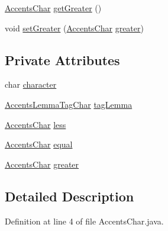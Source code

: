\begin{DoxyCompactItemize}
\item 
\hyperlink{classbr_1_1usp_1_1cata_1_1util_1_1lemmatizer_1_1_accents_char}{Accents\+Char} \hyperlink{classbr_1_1usp_1_1cata_1_1util_1_1lemmatizer_1_1_accents_char_a192c696ecbf7ed1cccb6bb233048b935}{get\+Greater} ()
\item 
void \hyperlink{classbr_1_1usp_1_1cata_1_1util_1_1lemmatizer_1_1_accents_char_ad60c7c8cd8ba6de43e9e06c6f2306e40}{set\+Greater} (\hyperlink{classbr_1_1usp_1_1cata_1_1util_1_1lemmatizer_1_1_accents_char}{Accents\+Char} \hyperlink{classbr_1_1usp_1_1cata_1_1util_1_1lemmatizer_1_1_accents_char_a3680eda0e3124a1c26639cde19bc3f3f}{greater})
\end{DoxyCompactItemize}
\subsection*{Private Attributes}
\begin{DoxyCompactItemize}
\item 
char \hyperlink{classbr_1_1usp_1_1cata_1_1util_1_1lemmatizer_1_1_accents_char_adead262403ce29190286fbc5c04ec1f6}{character}
\item 
\hyperlink{classbr_1_1usp_1_1cata_1_1util_1_1lemmatizer_1_1_accents_lemma_tag_char}{Accents\+Lemma\+Tag\+Char} \hyperlink{classbr_1_1usp_1_1cata_1_1util_1_1lemmatizer_1_1_accents_char_a0cb3f3f9b47f36a8786117764e48281f}{tag\+Lemma}
\item 
\hyperlink{classbr_1_1usp_1_1cata_1_1util_1_1lemmatizer_1_1_accents_char}{Accents\+Char} \hyperlink{classbr_1_1usp_1_1cata_1_1util_1_1lemmatizer_1_1_accents_char_ad84239a5da911adc9af48baa464a54db}{less}
\item 
\hyperlink{classbr_1_1usp_1_1cata_1_1util_1_1lemmatizer_1_1_accents_char}{Accents\+Char} \hyperlink{classbr_1_1usp_1_1cata_1_1util_1_1lemmatizer_1_1_accents_char_afe7a303e8950e63eeee270149768944c}{equal}
\item 
\hyperlink{classbr_1_1usp_1_1cata_1_1util_1_1lemmatizer_1_1_accents_char}{Accents\+Char} \hyperlink{classbr_1_1usp_1_1cata_1_1util_1_1lemmatizer_1_1_accents_char_a3680eda0e3124a1c26639cde19bc3f3f}{greater}
\end{DoxyCompactItemize}


\subsection{Detailed Description}


Definition at line 4 of file Accents\+Char.\+java.



